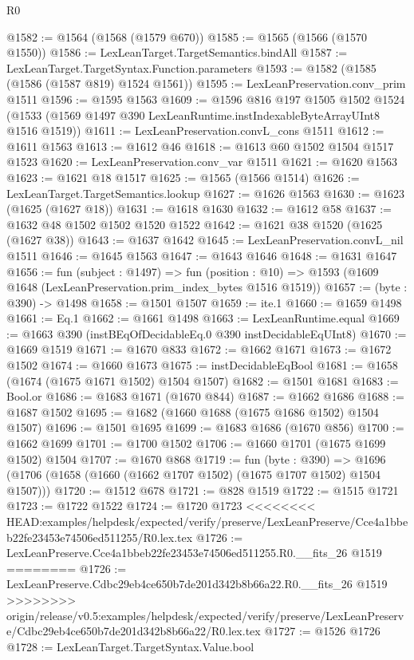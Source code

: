 \begin{lexlean}{R0}
\begin{coremodule}
{{{{{{{{{{{{{{{{{{{{{{{{{{{{{{{{{{{{{{{{{{{{{{{{{{{{{{{{{{{{{{{{{{{{{{{{{@1582 := @1564 (@1568 (@1579 @670))
@1585 := @1565 (@1566 (@1570 @1550))
@1586 := LexLeanTarget.TargetSemantics.bindAll
@1587 := LexLeanTarget.TargetSyntax.Function.parameters
@1593 := @1582 (@1585 (@1586 (@1587 @819) @1524 @1561))
@1595 := LexLeanPreservation.conv_prim @1511
@1596 := @1595 @1563
@1609 := @1596
    @816
    @197
    @1505
    @1502
    @1524
    (@1533 (@1569 @1497 @390 LexLeanRuntime.instIndexableByteArrayUInt8 @1516 @1519))
@1611 := LexLeanPreservation.convL_cons @1511
@1612 := @1611 @1563
@1613 := @1612 @46
@1618 := @1613 @60 @1502 @1504 @1517 @1523
@1620 := LexLeanPreservation.conv_var @1511
@1621 := @1620 @1563
@1623 := @1621 @18 @1517
@1625 := @1565 (@1566 @1514)
@1626 := LexLeanTarget.TargetSemantics.lookup
@1627 := @1626 @1563
@1630 := @1623 (@1625 (@1627 @18))
@1631 := @1618 @1630
@1632 := @1612 @58
@1637 := @1632 @48 @1502 @1502 @1520 @1522
@1642 := @1621 @38 @1520 (@1625 (@1627 @38))
@1643 := @1637 @1642
@1645 := LexLeanPreservation.convL_nil @1511
@1646 := @1645 @1563
@1647 := @1643 @1646
@1648 := @1631 @1647
@1656 := fun (subject : @1497) =>
  fun (position : @10) => @1593 (@1609 @1648 (LexLeanPreservation.prim_index_bytes @1516 @1519))
@1657 := (byte : @390) -> @1498
@1658 := @1501 @1507
@1659 := ite.{1}
@1660 := @1659 @1498
@1661 := Eq.{1}
@1662 := @1661 @1498
@1663 := LexLeanRuntime.equal
@1669 := @1663 @390 (instBEqOfDecidableEq.{0} @390 instDecidableEqUInt8)
@1670 := @1669 @1519
@1671 := @1670 @833
@1672 := @1662 @1671
@1673 := @1672 @1502
@1674 := @1660 @1673
@1675 := instDecidableEqBool
@1681 := @1658 (@1674 (@1675 @1671 @1502) @1504 @1507)
@1682 := @1501 @1681
@1683 := Bool.or
@1686 := @1683 @1671 (@1670 @844)
@1687 := @1662 @1686
@1688 := @1687 @1502
@1695 := @1682 (@1660 @1688 (@1675 @1686 @1502) @1504 @1507)
@1696 := @1501 @1695
@1699 := @1683 @1686 (@1670 @856)
@1700 := @1662 @1699
@1701 := @1700 @1502
@1706 := @1660 @1701 (@1675 @1699 @1502) @1504
@1707 := @1670 @868
@1719 := fun (byte : @390) =>
  @1696 (@1706 (@1658 (@1660 (@1662 @1707 @1502) (@1675 @1707 @1502) @1504 @1507)))
@1720 := @1512 @678
@1721 := @828 @1519
@1722 := @1515 @1721
@1723 := @1722 @1522
@1724 := @1720 @1723
<<<<<<<< HEAD:examples/helpdesk/expected/verify/preserve/LexLeanPreserve/Cce4a1bbeb22fe23453e74506ed511255/R0.lex.tex
@1726 := LexLeanPreserve.Cce4a1bbeb22fe23453e74506ed511255.R0.__fits_26 @1519
========
@1726 := LexLeanPreserve.Cdbc29eb4ce650b7de201d342b8b66a22.R0.__fits_26 @1519
>>>>>>>> origin/release/v0.5:examples/helpdesk/expected/verify/preserve/LexLeanPreserve/Cdbc29eb4ce650b7de201d342b8b66a22/R0.lex.tex
@1727 := @1526 @1726
@1728 := LexLeanTarget.TargetSyntax.Value.bool
}}}}}}}}}}}}}}}}}}}}}}}}}}}}}}}}}}}}}}}}}}}}}}}}}}}}}}}}}}}}}}}}}}}}}}}}}
\end{coremodule}
\end{lexlean}
